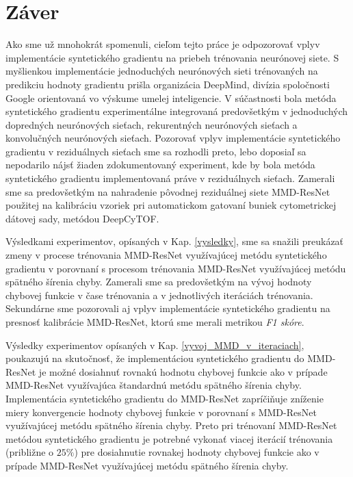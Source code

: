 \chapter*{Záver}  %

Ako sme už mnohokrát spomenuli, cieľom tejto práce je odpozorovať vplyv implementácie syntetického gradientu na priebeh trénovania neurónovej siete. S myšlienkou implementácie jednoduchých neurónových sieti trénovaných na predikciu hodnoty gradientu prišla organizácia DeepMind, divízia spoločnosti Google orientovaná vo výskume umelej inteligencie. V súčastnosti bola metóda syntetického gradientu experimentálne integrovaná predovšetkým v jednoduchých dopredných neurónových sieťach, rekurentných neurónových sieťach a konvolučných neurónových sieťach.
Pozorovať vplyv implementácie syntetického gradientu v reziduálnych sieťach sme sa rozhodli preto, lebo doposiaľ sa nepodarilo nájsť žiaden zdokumentovaný experiment, kde by bola metóda syntetického gradientu implementovaná práve v reziduálnych sieťach. Zamerali sme sa predovšetkým na nahradenie pôvodnej reziduálnej siete MMD-ResNet použitej na kalibráciu vzoriek pri automatickom gatovaní buniek cytometrickej dátovej sady, metódou DeepCyTOF.

Výsledkami experimentov, opísaných v Kap. \ref{vysledky}, sme sa snažili preukázať zmeny v procese trénovania MMD-ResNet využívajúcej metódu syntetického gradientu v porovnaní s procesom trénovania MMD-ResNet využívajúcej metódu spätného šírenia chyby. Zamerali sme sa predovšetkým na vývoj hodnoty chybovej funkcie v čase trénovania a v jednotlivých iteráciách trénovania. Sekundárne sme pozorovali aj vplyv implementácie syntetického gradientu na presnosť kalibrácie MMD-ResNet, ktorú sme merali metrikou \textit{F1 skóre}.

Výsledky experimentov opísaných v Kap. \ref{vyvoj_MMD_v_iteraciach}, poukazujú na skutočnosť, že implementáciou syntetického gradientu do MMD-ResNet je možné dosiahnuť rovnakú hodnotu chybovej funkcie ako v prípade MMD-ResNet využívajúca štandardnú metódu spätného šírenia chyby. Implementácia syntetického gradientu do MMD-ResNet zapríčiňuje zníženie miery konvergencie hodnoty chybovej funkcie v porovnaní s MMD-ResNet využívajúcej metódu spätného šírenia chyby. Preto pri trénovaní MMD-ResNet metódou syntetického gradientu je potrebné vykonať viacej iterácií trénovania (približne o $25\%$) pre dosiahnutie rovnakej hodnoty chybovej funkcie ako v prípade MMD-ResNet využívajúcej metódu spätného šírenia chyby.

